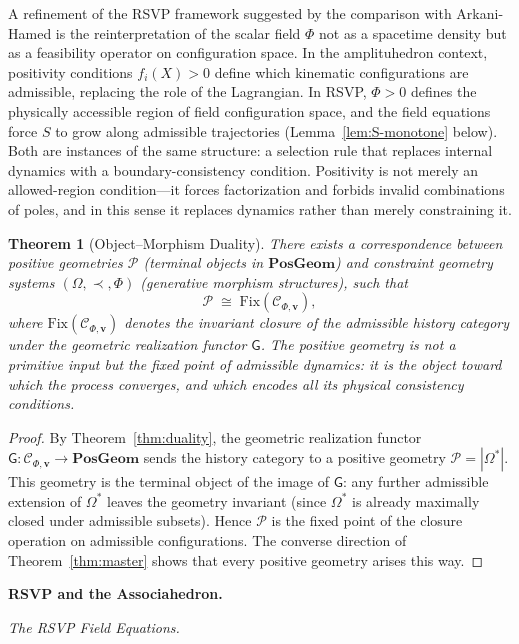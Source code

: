 \documentclass[11pt]{article}
\theoremstyle{plain}
\newtheorem{theorem}{Theorem}[section]
\theoremstyle{definition}
\theoremstyle{remark}
\newcommand{\Phif}{\Phi}
\newcommand{\Sf}{S}
\newcommand{\OmKS}{\Omega}
\newcommand{\PG}{\mathbf{PosGeom}}
\newcommand{\Ccat}{\mathcal{C}_{\Phi,\mathbf{v}}}
\newcommand{\Gfun}{\mathsf{G}}
\begin{document}
A refinement of the RSVP framework suggested by the comparison with Arkani-Hamed is the reinterpretation of the scalar field $\Phif$ not as a spacetime density but as a feasibility operator on configuration space. In the amplituhedron context, positivity conditions $f_i(X) > 0$ define which kinematic configurations are admissible, replacing the role of the Lagrangian. In RSVP, $\Phif > 0$ defines the physically accessible region of field configuration space, and the field equations force $\Sf$ to grow along admissible trajectories (Lemma~\ref{lem:S-monotone} below). Both are instances of the same structure: a selection rule that replaces internal dynamics with a boundary-consistency condition. Positivity is not merely an allowed-region condition---it forces factorization and forbids invalid combinations of poles, and in this sense it replaces dynamics rather than merely constraining it.

\begin{theorem}[Object--Morphism Duality]
\label{thm:obj-morph}
There exists a correspondence between positive geometries $\mathcal{P}$ (terminal objects in $\PG$) and constraint geometry systems $(\OmKS, \prec, \Phif)$ (generative morphism structures), such that
\[
  \mathcal{P} \;\cong\; \mathrm{Fix}(\Ccat),
\]
where $\mathrm{Fix}(\Ccat)$ denotes the invariant closure of the admissible history category under the geometric realization functor $\Gfun$. The positive geometry is not a primitive input but the fixed point of admissible dynamics: it is the object toward which the process converges, and which encodes all its physical consistency conditions.
\end{theorem}

\begin{proof}
By Theorem~\ref{thm:duality}, the geometric realization functor $\Gfun: \Ccat \to \PG$ sends the history category to a positive geometry $\mathcal{P} = |\OmKS^*|$. This geometry is the terminal object of the image of $\Gfun$: any further admissible extension of $\OmKS^*$ leaves the geometry invariant (since $\OmKS^*$ is already maximally closed under admissible subsets). Hence $\mathcal{P}$ is the fixed point of the closure operation on admissible configurations. The converse direction of Theorem~\ref{thm:master} shows that every positive geometry arises this way.
\end{proof}

\bigskip\noindent\textbf{RSVP and the Associahedron.}
\label{sec:rsvp}

\medskip\noindent\textit{The RSVP Field Equations.}
\end{document}
